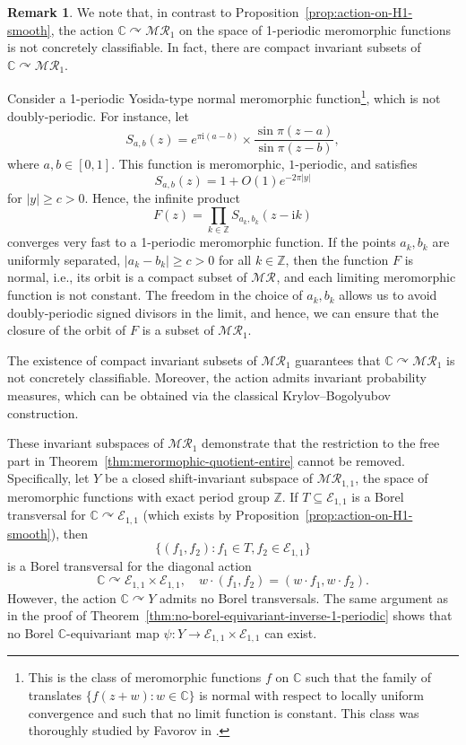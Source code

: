 \documentclass[12pt]{paper}
\numberwithin{equation}{section}
\theoremstyle{plain}
\theoremstyle{definition}
\newtheorem{remark}[theorem]{Remark}
\newcommand{\C}{\mathbb{C}}
\newcommand{\Z}{\mathbb{Z}}
\newcommand{\im}{\mathrm{i}} %
\newcommand{\merom}[1][]{\mathcal{MR}_{#1}}
\newcommand{\holom}[1][]{\mathcal{E}_{#1}}
\newcommand{\acts}{\curvearrowright}
\begin{document}
\begin{remark}
  \label{rem:yosida-type-normal-meromorphic}
  We note that, in contrast to Proposition~\ref{prop:action-on-H1-smooth}, the action
  \(\C \acts \merom[1]\) on the space of 1-periodic meromorphic functions is not concretely
  classifiable.  In fact, there are compact invariant subsets of \(\C \acts \merom[1]\).

  Consider a 1-periodic Yosida-type normal meromorphic function\footnote{ This is the class of
    meromorphic functions \(f\) on \(\C\) such that the family of translates \(\{f(z+w):w\in \C\}\)
    is normal with respect to locally uniform convergence and such that no limit function is
    constant. This class was thoroughly studied by Favorov in \cite{MR2403439}.}, which is not
  doubly-periodic.  For instance, let
  \[S_{a, b}(z) = e^{\pi \im (a-b)} \times \frac{\sin\pi (z-a)}{\sin\pi (z-b)},\]
  where \(a, b \in [0,1]\). This function is meromorphic, \(1\)-periodic, and satisfies
  \[
    S_{a, b}(z)=1 + O(1)e^{-2\pi |y|}
  \]
  for \(|y|\ge c>0\).  Hence, the infinite product \[F(z) = \prod_{k\in \Z} S_{a_k, b_k} (z- \im k)\]
  converges very fast to a 1-periodic meromorphic function. If the points \(a_k, b_k\) are uniformly
  separated, \(|a_k-b_k| \ge c >0\) for all \(k \in \Z\), then the function \(F\) is normal, i.e.,
  its orbit is a compact subset of \(\merom\), and each limiting meromorphic function is not
  constant. The freedom in the choice of \(a_k, b_k\) allows us to avoid doubly-periodic signed
  divisors in the limit, and hence, we can ensure that the closure of the orbit of \(F\) is a subset
  of \(\merom[1]\).

  The existence of compact invariant subsets of \(\merom[1]\) guarantees that \(\C \acts \merom[1]\)
  is not concretely classifiable. Moreover, the action admits invariant probability measures, which
  can be obtained via the classical Krylov--Bogolyubov construction.

  These invariant subspaces of \(\merom[1]\) demonstrate that the restriction to the free part in
  Theorem~\ref{thm:merormophic-quotient-entire} cannot be removed. Specifically, let \(Y\) be a
  closed shift-invariant subspace of \(\merom[1,1]\), the space of meromorphic functions with exact
  period group \(\Z\).  If
  \(T \subseteq \holom[1,1]\) is a Borel transversal for \(\C \acts \holom[1,1]\) (which exists by
  Proposition~\ref{prop:action-on-H1-smooth}), then
  \[\{(f_{1}, f_{2}) : f_{1} \in T, f_{2} \in \holom[1,1]\}\]
  is a Borel transversal for the diagonal action
  \[\C \acts \holom[1,1] \times \holom[1,1], \quad w \cdot (f_{1}, f_{2}) = (w \cdot f_{1}, w \cdot
    f_{2}).\]
  However, the action \(\C \acts Y\) admits no Borel transversals. The same argument as in the proof
  of Theorem~\ref{thm:no-borel-equivariant-inverse-1-periodic} shows that no Borel
  \(\C\)-equivariant map \(\psi : Y \to \holom[1,1] \times \holom[1,1]\) can exist.
\end{remark}
\end{document}

